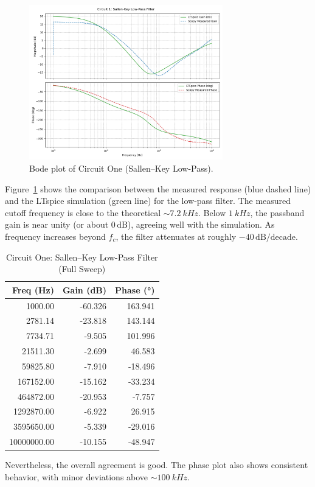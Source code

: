 \documentclass[12pt]{article}
\begin{document}
\begin{figure}[H]
	\centering
	\includegraphics[width=0.75\textwidth]{07_bode1}
	\caption{Bode plot of Circuit One (Sallen--Key Low-Pass).}
	\label{fig:bode1}
\end{figure}

Figure~\ref{fig:bode1} shows the comparison between the measured response (blue
dashed line) and the LTspice simulation (green line) for the low-pass filter.
The measured cutoff frequency is close to the theoretical $\sim\SI{7.2}{kHz}$.
Below $\SI{1}{kHz}$, the passband gain is near unity (or about $0\,\mathrm{dB}$),
agreeing well with the simulation. As frequency increases beyond $f_c$, the
filter attenuates at roughly $-40\,\mathrm{dB/decade}$.

\begin{table}[H]
	\centering
	\begin{tabular}{|r|r|r|}
		\hline
		\textbf{Freq (Hz)} & \textbf{Gain (dB)} & \textbf{Phase (°)} \\
		\hline
		1000.00            & -60.326            & 163.941            \\
		2781.14            & -23.818            & 143.144            \\
		7734.71            & -9.505             & 101.996            \\
		21511.30           & -2.699             & 46.583             \\
		59825.80           & -7.910             & -18.496            \\
		167152.00          & -15.162            & -33.234            \\
		464872.00          & -20.953            & -7.757             \\
		1292870.00         & -6.922             & 26.915             \\
		3595650.00         & -5.339             & -29.016            \\
		10000000.00        & -10.155            & -48.947            \\
		\hline
	\end{tabular}
	\caption{Circuit One: Sallen--Key Low-Pass Filter (Full Sweep)}
	\label{tab:C1_LPF_full}
\end{table}
Nevertheless, the overall agreement is good. The phase plot also shows
consistent behavior, with minor deviations above $\sim\SI{100}{kHz}$.
\end{document}
